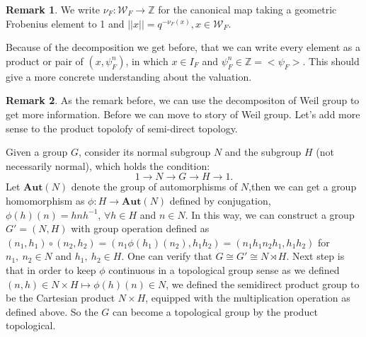 \documentclass[12pt,a4paper,english]{article}
\theoremstyle{definition}
\newtheorem*{rem}{Remark}
\theoremstyle{plain}
\begin{document}
\begin{rem}
We write $\nu_{F}:\mathcal{W}_{F}\rightarrow\mathbb{Z}$ for the canonical map taking a geometric Frobenius element to 1 and $||x||=q^{-\nu_{F}(x)},x\in\mathcal{W}_{F}.$

Because of the decomposition we get before, that we can write every element as a product or pair of $(x,\psi^{n}_{F})$, in which $x\in I_{F}$ and $\psi^{n}_{F}\in \mathbb{Z}=<\psi_{F}>$. This should give a more concrete understanding about the valuation.
\end{rem}


\begin{rem}
As the remark before, we can use the decompositon of Weil group to get more information. Before we can move to story of Weil group. Let's add more sense to the product topolofy of semi-direct topology. 

Given a group $G$, consider its normal subgroup $N$ and the subgroup $H$ (not necessarily normal), which holds the condition:
\begin{equation*}
    1\rightarrow N\rightarrow G\rightarrow H\rightarrow 1.
\end{equation*}
Let $\textbf{Aut}(N)$ denote the group of automorphisms of $N$,then we can get a group homomorphism as $\phi: H\rightarrow\textbf{Aut}(N)$ defined by conjugation, $\phi(h)(n)=hnh^{-1}$, $\forall h\in H$ and $n\in N$. In this way, we can construct a group $G'=(N,H)$ with group operation defined as $(n_{1},h_{1})\circ(n_{2},h_{2})=(n_{1}\phi(h_{1})(n_{2}),h_{1}h_{2})=(n_{1}h_{1}n_{2}h_{1},h_{1}h_{2})$ for $n_{1},\ n_{2}\in N$ and $h_{1},\ h_{2}\in H$. One can verify that $G\cong G'\cong N\rtimes H$. Next step is that in order to keep $\phi$ continuous in a topological group sense as we defined $(n,h)\in N\times H\mapsto \phi(h)(n)\in N$, we defined the semidirect product group to be the Cartesian product $N\times H$, equipped with the multiplication operation as defined above. So the $G$ can become a topological group by the product topological.









\end{rem}
\end{document}
